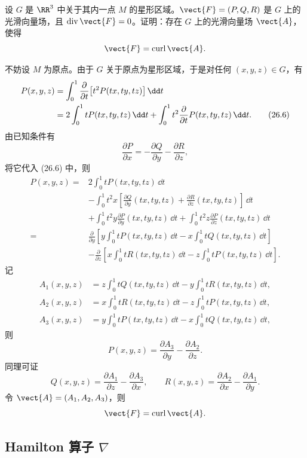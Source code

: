 \begin{xexample}[26.1.2]
设 $G$ 是 $\RR^3$ 中关于其内一点 $M$ 的星形区域。$\vect{F}=(P,Q,R)$ 是 $G$ 上的光滑向量场，且 $\operatorname{div}\vect{F}=0$。证明：存在 $G$ 上的光滑向量场 $\vect{A}$，使得
\[
  \vect{F}=\operatorname{curl}\vect{A}.
\]
\end{xexample}
\begin{xproof}
不妨设 $M$ 为原点。由于 $G$ 关于原点为星形区域，于是对任何 $(x,y,z)\in G$，有
\begin{align}
  P(x,y,z)
  &=\int_0^1\frac{\partial}{\partial t}\bigl[t^2P(tx,ty,tz)\bigr]\,\dd t\notag\\
  &=2\int_0^1 tP(tx,ty,tz)\,\dd t
  +\int_0^1 t^2\frac{\partial}{\partial t}P(tx,ty,tz)\,\dd t.
  \tag{26.6}
  \label{eq:26.6}
\end{align}
由已知条件有
\[
  \frac{\partial P}{\partial x}
  =-\frac{\partial Q}{\partial y}-\frac{\partial R}{\partial z},
\]
将它代入 (26.6) 中，则
\begin{align*}
  P(x,y,z)
  ={}&2\int_0^1 tP(tx,ty,tz)\,\dd t\\
  &-\int_0^1 t^2x\left[\frac{\partial Q}{\partial y}(tx,ty,tz)+\frac{\partial R}{\partial z}(tx,ty,tz)\right]\,\dd t\\
  &+\int_0^1 t^2y\frac{\partial P}{\partial y}(tx,ty,tz)\,\dd t
  +\int_0^1 t^2z\frac{\partial P}{\partial z}(tx,ty,tz)\,\dd t\\
  ={}&\frac{\partial}{\partial y}\left[y\int_0^1tP(tx,ty,tz)\,\dd t-x\int_0^1tQ(tx,ty,tz)\,\dd t\right]\\
  &-\frac{\partial}{\partial z}\left[x\int_0^1tR(tx,ty,tz)\,\dd t-z\int_0^1tP(tx,ty,tz)\,\dd t\right].
\end{align*}
记
\begin{align*}
  A_1(x,y,z)&=z\int_0^1tQ(tx,ty,tz)\,\dd t-y\int_0^1tR(tx,ty,tz)\,\dd t,\\
  A_2(x,y,z)&=x\int_0^1tR(tx,ty,tz)\,\dd t-z\int_0^1tP(tx,ty,tz)\,\dd t,\\
  A_3(x,y,z)&=y\int_0^1tP(tx,ty,tz)\,\dd t-x\int_0^1tQ(tx,ty,tz)\,\dd t,
\end{align*}
则
\[
  P(x,y,z)=\frac{\partial A_3}{\partial y}-\frac{\partial A_2}{\partial z}.
\]
同理可证
\[
  Q(x,y,z)=\frac{\partial A_1}{\partial z}-\frac{\partial A_3}{\partial x},
  \qquad
  R(x,y,z)=\frac{\partial A_2}{\partial x}-\frac{\partial A_1}{\partial y}.
\]
令 $\vect{A}=(A_1,A_2,A_3)$，则
\[
  \vect{F}=\operatorname{curl}\vect{A}.
\]
\end{xproof}

\subsection{\texorpdfstring{Hamilton 算子 $\nabla$}{Hamilton 算子 ∇}}

